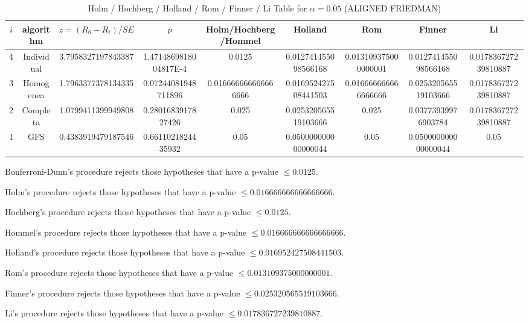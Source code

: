 \documentclass[a4paper,10pt]{article}
\begin{document}
\begin{landscape}
\begin{table}[!htp]
\centering\scriptsize
\caption{Holm / Hochberg / Holland / Rom / Finner / Li Table for $\alpha=0.05$ (ALIGNED FRIEDMAN)}
\begin{tabular}{ccccccccc}
$i$&algorithm&$z=(R_0 - R_i)/SE$&$p$&Holm/Hochberg/Hommel&Holland&Rom&Finner&Li\\
\hline
4&Individual&3.7958327197843387&1.4714869818004817E-4&0.0125&0.012741455098566168&0.013109375000000001&0.012741455098566168&0.017836727239810887\\
3&Homogenea&1.7963377378134335&0.07244081948711896&0.016666666666666666&0.016952427508441503&0.016666666666666666&0.025320565519103666&0.017836727239810887\\
2&Completa&1.0799411399949808&0.2801683917827426&0.025&0.025320565519103666&0.025&0.03773939976903784&0.017836727239810887\\
1&GFS&0.4383919479187546&0.6611021824435932&0.05&0.050000000000000044&0.05&0.050000000000000044&0.05\\
\hline
\end{tabular}
\end{table}
Bonferroni-Dunn's procedure rejects those hypotheses that have a p-value $\le0.0125$.


Holm's procedure rejects those hypotheses that have a p-value $\le0.016666666666666666$.


Hochberg's procedure rejects those hypotheses that have a p-value $\le0.0125$.


Hommel's procedure rejects those hypotheses that have a p-value $\le0.016666666666666666$.


Holland's procedure rejects those hypotheses that have a p-value $\le0.016952427508441503$.


Rom's procedure rejects those hypotheses that have a p-value $\le0.013109375000000001$.


Finner's procedure rejects those hypotheses that have a p-value $\le0.025320565519103666$.


Li's procedure rejects those hypotheses that have a p-value $\le0.017836727239810887$.



\newpage


\end{landscape}
\end{document}
